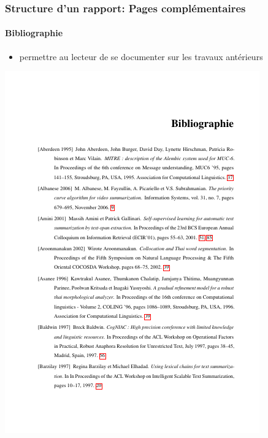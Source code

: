 \documentclass[xcolor=table]{beamer}
\begin{document}
\begin{frame}
\frametitle{Structure d'un rapport: Pages complémentaires}
\framesubtitle{Bibliographie}

\begin{minipage}{0.52\textwidth}
	\begin{itemize}
		\item permettre au lecteur de se documenter sur les travaux antérieurs
	\end{itemize}
\end{minipage}
\begin{minipage}{0.42\textwidth}
	\includegraphics[width=\textwidth]{..//img/Bweb03-redaction/bibliographie.png}
\end{minipage}

\end{frame}


\end{document}
